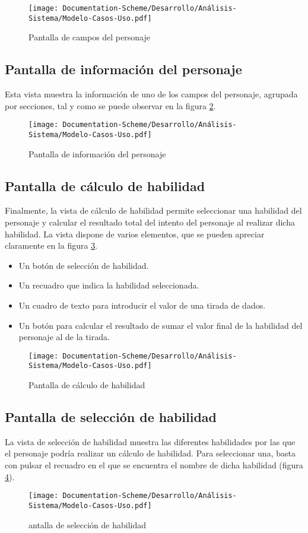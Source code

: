 \begin{figure}[H]
    \centering
    \texttt{[image: Documentation-Scheme/Desarrollo/Análisis-Sistema/Modelo-Casos-Uso.pdf]}
    \caption{Pantalla de campos del personaje}
    \label{CamposPersonaje}    
\end{figure}

\subsection{Pantalla de información del personaje}
Esta vista muestra la información de uno de los campos del personaje, agrupada por secciones, tal y como 
se puede observar en la figura \ref*{InfoPersonaje}.


\begin{figure}[H]
    \centering
    \texttt{[image: Documentation-Scheme/Desarrollo/Análisis-Sistema/Modelo-Casos-Uso.pdf]}
    \caption{Pantalla de información del personaje}
    \label{InfoPersonaje}    
\end{figure}

\subsection{Pantalla de cálculo de habilidad}
Finalmente, la vista de cálculo de habilidad permite seleccionar una habilidad del personaje y 
calcular el resultado total del intento del personaje al realizar dicha habilidad. La vista dispone de varios elementos, 
que se pueden apreciar claramente en la figura \ref*{CalculoHabilidad}.
\begin{itemize}
    \item Un botón de selección de habilidad.
    \item Un recuadro que indica la habilidad seleccionada.
    \item Un cuadro de texto para introducir el valor de una tirada de dados.
    \item Un botón para calcular el resultado de sumar el valor final de la habilidad del personaje al de la tirada.
\end{itemize}

\begin{figure}[H]
    \centering
    \texttt{[image: Documentation-Scheme/Desarrollo/Análisis-Sistema/Modelo-Casos-Uso.pdf]}
    \caption{Pantalla de cálculo de habilidad}
    \label{CalculoHabilidad}    
\end{figure}

\subsection{Pantalla de selección de habilidad}
La vista de selección de habilidad muestra las diferentes habilidades por las que el personaje podría 
realizar un cálculo de habilidad. Para seleccionar una, basta con pulsar el recuadro en el que se encuentra 
el nombre de dicha habilidad (figura \ref*{SeleccionHabilidad}).

\begin{figure}[H]
    \centering
    \texttt{[image: Documentation-Scheme/Desarrollo/Análisis-Sistema/Modelo-Casos-Uso.pdf]}
    \caption{antalla de selección de habilidad}
    \label{SeleccionHabilidad}    
\end{figure}

